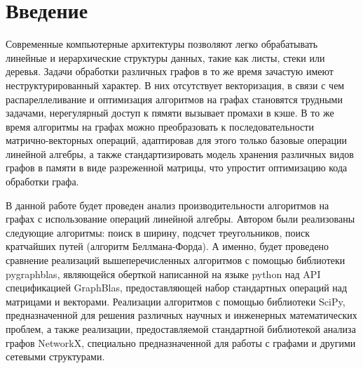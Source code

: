 \section{Введение}

Современные компьютерные архитектуры позволяют легко обрабатывать линейные и иерархические структуры данных, такие как листы, стеки или деревья. Задачи обработки различных графов в то же время зачастую имеют неструктурированный характер. В них отсутствует векторизация, в связи с чем распареллеливание и оптимизация алгоритмов на графах становятся трудными задачами, нерегулярный доступ к пямяти вызывает промахи в кэше. В то же время алгоритмы на графах можно преобразовать к последовательности матрично-векторных операций, адаптировав для этого только базовые операции линейной алгебры, а также стандартизировать модель хранения различных видов графов в памяти в виде разреженной матрицы, что упростит оптимизацию кода обработки графа.

В данной работе будет проведен анализ производительности алгоритмов на графах с использование
операций линейной алгебры. Автором были реализованы следующие алгоритмы: поиск в ширину, подсчет
треугольников, поиск кратчайших путей (алгоритм Беллмана-Форда). А именно, будет проведено
сравнение реализаций вышеперечисленных алгоритмов с помощью библиотеки pygraphblas, являющейся оберткой написанной на языке python над API спецификацией GraphBlas, предоставляющей набор стандартных операций над матрицами и векторами. Реализации алгоритмов с помощью библиотеки SciPy, предназначенной для решения различных научных и инженерных математических проблем, а также реализации, предоставляемой стандартной библиотекой анализа графов NetworkX, специально предназначенной для работы с графами и другими сетевыми структурами.
